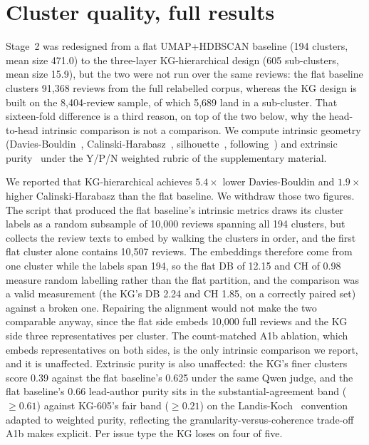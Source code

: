 \documentclass[11pt]{article}
\begin{document}
\section{Cluster quality, full results}



  Stage~2 was redesigned from a flat UMAP+HDBSCAN baseline (194 clusters, mean size 471.0) to the
   three-layer KG-hierarchical design (605 sub-clusters, mean size 15.9), but the two were not run
   over the same reviews: the flat baseline clusters 91{,}368 reviews from the full relabelled
   corpus, whereas the KG design is built on the 8{,}404-review sample, of which 5{,}689 land in a
   sub-cluster. That sixteen-fold difference is a third reason, on top of the two below, why the
   head-to-head intrinsic comparison is not a comparison.
   We compute intrinsic geometry (Davies-Bouldin~\cite{davies1979cluster},
  Calinski-Harabasz~\cite{calinski1974dendrite}, silhouette~\cite{rousseeuw1987silhouettes},
  following~\cite{schutze2008introduction, steinbach2000comparison, strehl2002cluster}) and
  extrinsic purity~\cite{amigo2009comparison} under the Y/P/N weighted rubric of
  the supplementary material.

We reported that KG-hierarchical achieves $5.4\times$ lower Davies-Bouldin and $1.9\times$
  higher Calinski-Harabasz than the flat baseline. We withdraw those two figures. The script that
  produced the flat baseline's intrinsic metrics draws its cluster labels as a random subsample of
  10{,}000 reviews spanning all 194 clusters, but collects the review texts to embed by walking
  the clusters in order, and the first flat cluster alone contains 10{,}507 reviews. The
  embeddings therefore come from one cluster while the labels span 194, so the flat DB of 12.15
  and CH of 0.98 measure random labelling rather than the flat partition, and the comparison was a
  valid measurement (the KG's DB 2.24 and CH 1.85, on a correctly paired set) against a broken
  one. Repairing the alignment would not make the two comparable anyway, since the flat side
  embeds 10{,}000 full reviews and the KG side three representatives per cluster. The count-matched
  A1b ablation, which embeds representatives on both sides, is the only intrinsic comparison we
  report, and it is unaffected. Extrinsic purity is also unaffected: the KG's finer clusters score 0.39 against
  the flat baseline's 0.625 under the same Qwen judge, and the flat baseline's 0.66 lead-author
  purity sits in the substantial-agreement band ($\geq 0.61$) against KG-605's fair band ($\geq
  0.21$) on the Landis-Koch~\cite{landis1977measurement} convention adapted to weighted purity,
  reflecting the granularity-versus-coherence trade-off A1b makes explicit. Per issue type the KG
  loses on four of five.
\end{document}
